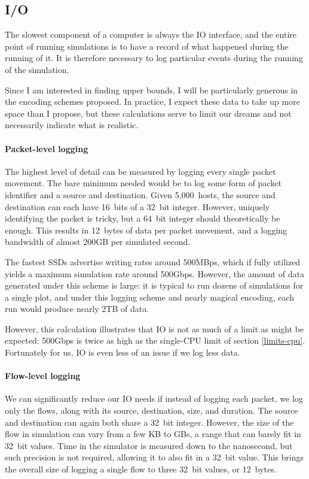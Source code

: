\subsection{I/O} \label{limits-io}

The slowest component of a computer is always the IO interface, and the entire point of running simulations is to have a record of what happened during the running of it.
It is therefore necessary to log particular events during the running of the simulation.

Since I am interested in finding upper bounds, I will be particularly generous in the encoding schemes proposed.
In practice, I expect these data to take up more space than I propose, but these calculations serve to limit our dreams and not necessarily indicate what is realistic.

\paragraph{Packet-level logging}
The highest level of detail can be measured by logging every single packet movement.
The bare minimum needed would be to log some form of packet identifier and a source and destination.
Given 5,000~hosts, the source and destination can each have 16~bits of a 32~bit integer.
However, uniquely identifying the packet is tricky, but a 64~bit integer should theoretically be enough.
This results in 12~bytes of data per packet movement, and a logging bandwidth of almost 200GB per simulated second.

The fastest SSDs advertise writing rates around 500MBps, which if fully utilized yields a maximum simulation rate around 500Gbps.
However, the amount of data generated under this scheme is large: it is typical to run dozens of simulations for a single plot, and under this logging scheme and nearly magical encoding, each run would produce nearly 2TB of data.

However, this calculation illustrates that IO is not as much of a limit as might be expected: 500Gbps is twice as high as the single-CPU limit of section \ref{limits-cpu}.
Fortunately for us, IO is even less of an issue if we log less data.

\paragraph{Flow-level logging}
We can significantly reduce our IO needs if instead of logging each packet, we log only the flows, along with its source, destination, size, and duration.
The source and destination can again both share a 32~bit integer.
However, the size of the flow in simulation can vary from a few KB to GBs, a range that can barely fit in 32~bit values.
Time in the simulator is measured down to the nanosecond, but such precision is not required, allowing it to also fit in a 32~bit value.
This brings the overall size of logging a single flow to three 32~bit values, or 12~bytes.

